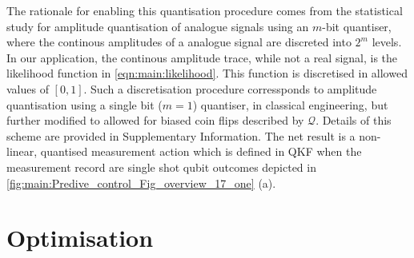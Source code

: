  The rationale for enabling this quantisation procedure comes from the statistical study for amplitude quantisation of analogue signals using an $m$-bit quantiser, where the continous amplitudes of a analogue signal are discreted into $2^m$ levels. In our application, the continous amplitude trace, while not a real signal, is the likelihood function in \cref{eqn:main:likelihood}. This function is discretised in allowed values of $ [0,1]$. Such a discretisation procedure corressponds to amplitude quantisation using a single bit ($m=1$) quantiser, in classical engineering, but further modified to allowed for biased coin flips described by $\mathcal{Q}$. Details of this  scheme are provided in Supplementary Information. The net result is a non-linear, quantised measurement action which is defined in QKF when the measurement record are single shot qubit outcomes depicted in \cref{fig:main:Predive_control_Fig_overview_17_one} (a). 

\section{Optimisation \label{sec:main:Optimisation}}

